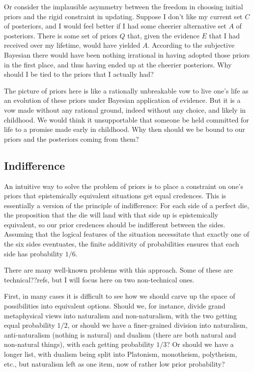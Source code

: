 Or consider the implausible asymmetry between the freedom in choosing initial priors and the
rigid constraint in updating. Suppose I don't like my current set $C$ of posteriors, and I would 
feel better if  I had some cheerier alternative set $A$ of posteriors. There is some set of priors $Q$ that, 
given the evidence $E$ that I had received over my lifetime, would have yielded $A$. According to 
the subjective Bayesian there would have been nothing irrational in having adopted those priors in 
the first place, and thus having ended up at the cheerier posteriors. Why should I be tied to the
priors that I actually had? 

The picture of priors here is like a rationally unbreakable vow to live one's life as an evolution
of these priors under Bayesian application of evidence. But it is a vow made without any rational 
ground, indeed without any choice, and likely in childhood. We would think it unsupportable that
someone be held committed for life to a promise made early in childhood. Why then should we be bound to
our priors and the posteriors coming from them?

\subsection{Indifference}
An intuitive way to solve the problem of priors is to place a constraint on one's priors that 
epistemically equivalent situations get equal credences. This is essentially a version of the 
principle of indifference: For each side of a perfect die, the proposition that the die will land 
with that side up is epistemically equivalent, so our prior credences should be indifferent between
the sides. Assuming that the logical features of the situation necessitate that exactly one of the six 
sides eventuates, the finite additivity of probabilities ensures that each side has probability $1/6$.

There are many well-known problems with this approach. Some of these are technical??refs, but I will
focus here on two non-technical ones.

First, in many cases it is
difficult to see how we should carve up the space of possibilities into equivalent options. Should we,
for instance, divide grand metaphysical views  into naturalism and non-naturalism, with the two getting
equal probability $1/2$, or should we have a finer-grained division into naturalism, anti-naturalism
(nothing is natural) and dualism (there are both natural and non-natural things), with each getting 
probability $1/3$? Or should we have a longer list, with dualism being split into Platonism, monotheism,
polytheism, etc., but naturalism left as one item, now of rather low prior probability? 

